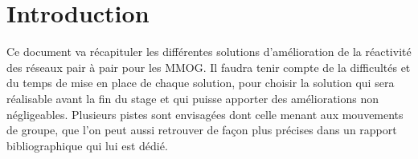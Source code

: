 \documentclass[11pt,a4paper]{article}
\begin{document}

\newpage
\tableofcontents
\newpage



\section{Introduction}
Ce document va récapituler les différentes solutions d'amélioration de la réactivité des réseaux pair à pair pour les MMOG. Il faudra tenir compte de la difficultés et du temps de mise en place de chaque solution, pour choisir la solution qui sera réalisable avant la fin du stage et qui puisse apporter des améliorations non négligeables.
Plusieurs pistes sont envisagées dont celle menant aux mouvements de groupe, que l'on peut aussi retrouver de façon plus précises dans un rapport bibliographique qui lui est dédié.

\newpage
\end{document}
